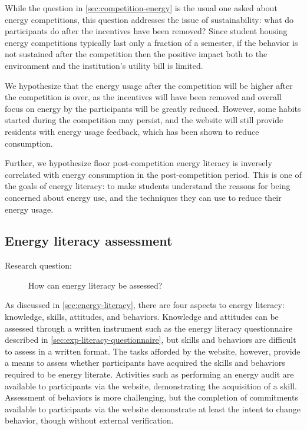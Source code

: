 While the question in \autoref{sec:competition-energy} is the usual one asked about energy competitions, this question addresses the issue of sustainability: what do participants do after the incentives have been removed? Since student housing energy competitions typically last only a fraction of a semester, if the behavior is not sustained after the competition then the positive impact both to the environment and the institution's utility bill is limited.

We hypothesize that the energy usage after the competition will be higher after the competition is over, as the incentives will have been removed and overall focus on energy by the participants will be greatly reduced. However, some habits started during the competition may persist, and the website will still provide residents with energy usage feedback, which has been shown to reduce consumption.

Further, we hypothesize floor post-competition energy literacy is inversely correlated with energy consumption in the post-competition period. This is one of the goals of energy literacy: to make students understand the reasons for being concerned about energy use, and the techniques they can use to reduce their energy usage.

\subsection{Energy literacy assessment}

\begin{description}
\item[Research question:] How can energy literacy be assessed?
\end{description}

As discussed in \autoref{sec:energy-literacy}, there are four aspects to energy literacy: knowledge, skills, attitudes, and behaviors. Knowledge and attitudes can be assessed through a written instrument such as the energy literacy questionnaire described in \autoref{sec:exp-literacy-questionnaire}, but skills and behaviors are difficult to assess in a written format. The tasks afforded by the website, however, provide a means to assess whether participants have acquired the skills and behaviors required to be energy literate. Activities such as performing an energy audit are available to participants via the website, demonstrating the acquisition of a skill. Assessment of behaviors is more challenging, but the completion of commitments available to participants via the website demonstrate at least the intent to change behavior, though without external verification.

